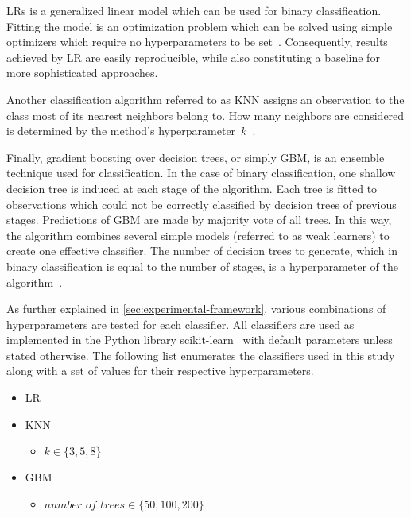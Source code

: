 \documentclass[sort&compress]{elsarticle}
\begin{document}
	\acp{LR} is a generalized linear model which can be used for binary
	classification. Fitting the model is an optimization problem which can be
	solved using simple optimizers which require no hyperparameters to be
	set~\citep{McCullagh.1984}. Consequently, results achieved by \ac{LR} are
	easily reproducible, while also constituting a baseline for more
	sophisticated approaches.

	Another classification algorithm referred to as \ac{KNN} assigns an
	observation to the class most of its nearest neighbors belong to. How many
	neighbors are considered is determined by the method's
	hyperparameter~$k$~\citep{Fix.1951}.

	Finally, gradient boosting over decision trees, or simply \ac{GBM}, is an
	ensemble technique used for classification. In the case of binary
	classification, one shallow decision tree is induced at each stage of the
	algorithm. Each tree is fitted to observations which could not be correctly
	classified by decision trees of previous stages. Predictions of \ac{GBM} are
	made by majority vote of all trees. In this way, the algorithm combines
	several simple models (referred to as weak learners) to create one effective
	classifier. The number of decision trees to generate, which in binary
	classification is equal to the number of stages, is a hyperparameter of the
	algorithm~\citep{Friedman.2001}. 

	As further explained in \cref{sec:experimental-framework}, various
	combinations of hyperparameters are tested for each classifier. All
	classifiers are used as implemented in the Python library
	scikit-learn~\citep{Pedregosa.2011} with default parameters unless stated
	otherwise. The following list enumerates the classifiers used in this study
	along with a set of values for their respective hyperparameters.
	\begin{itemize}
		\item \ac{LR}
		\item \ac{KNN}
		\begin{itemize}
            \item $k \in \{3, 5, 8\}$
		\end{itemize}
		\item \ac{GBM}
		\begin{itemize}
            \item $\textit{number of trees} \in \{50, 100, 200\}$
		\end{itemize}
	\end{itemize}
\end{document}
